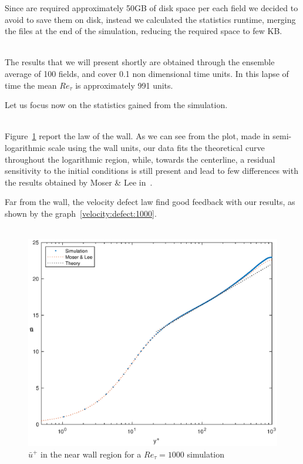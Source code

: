 Since are required approximately 50GB of disk space per each field we decided to avoid to save them on disk, instead we calculated the statistics runtime, merging the files at the end of the simulation, reducing the required space to few KB.\\~\par

The results that we will present shortly are obtained through the ensemble average of 100 fields, and cover 0.1 non dimensional time units. In this lapse of time the mean $Re_{\tau}$ is approximately 991 units.\par
Let us focus now on the statistics gained from the simulation.\\~\par
Figure~\ref{loglaw:1000} report the law of the wall. As we can see from the plot, made in semi-logarithmic scale using the wall units, our data fits the theoretical curve throughout the logarithmic region, while, towards the centerline, a residual sensitivity to the initial conditions is still present and lead to few differences with the results obtained by Moser \& Lee in~\cite{Lee}.\par
Far from the wall, the velocity defect law find good feedback with our results, as shown by the graph~\ref{velocity:defect:1000}.\\~\par

\begin{figure}
\begin{center}
\includegraphics[scale=0.55]{grafici/loglaw_1000.eps}
\caption{$\bar{u}^{+}$ in the near wall region for a $Re_{\tau}=1000$ simulation}
\label{loglaw:1000}
\end{center} 
\end{figure}

